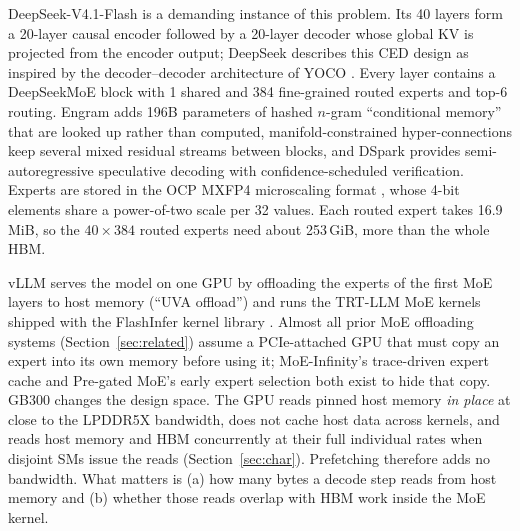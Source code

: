 \documentclass{article}
\newcommand{\secref}[1]{Section~\ref{#1}}
\begin{document}
DeepSeek-V4.1-Flash \citep{deepseekv41} is a demanding instance of this problem. Its 40 layers form a 20-layer causal
encoder followed by a 20-layer decoder whose global KV is projected from the encoder output; DeepSeek describes this
CED design as inspired by the decoder--decoder architecture of YOCO \citep{yoco}. Every layer contains a DeepSeekMoE
block \citep{deepseekmoe} with 1 shared and 384 fine-grained routed experts and top-6 routing. Engram \citep{engram}
adds 196B parameters of hashed $n$-gram ``conditional memory'' that are looked up rather than computed,
manifold-constrained hyper-connections \citep[mHC;][]{mhc} keep several mixed residual streams between blocks, and
DSpark \citep{dspark} provides semi-autoregressive speculative decoding with confidence-scheduled verification. Experts
are stored in the OCP MXFP4 microscaling format \citep{microscaling}, whose 4-bit elements share a power-of-two scale
per 32 values. Each routed expert takes 16.9\,MiB, so the $40 \times 384$ routed experts need about 253\,GiB, more than
the whole HBM.

vLLM \citep{vllm} serves the model on one GPU by offloading the experts of the first MoE layers to host memory (``UVA
offload'') and runs the TRT-LLM MoE kernels shipped with the FlashInfer kernel library \citep{flashinfer}. Almost all
prior MoE offloading systems (\secref{sec:related}) assume a PCIe-attached GPU that must copy an expert into its own
memory before using it; MoE-Infinity's trace-driven expert cache \citep{moeinfinity} and Pre-gated MoE's early expert
selection \citep{pregated} both exist to hide that copy. GB300 changes the design space. The GPU reads pinned host
memory \emph{in place} at close to the LPDDR5X bandwidth, does not cache host data across kernels, and reads host memory
and HBM concurrently at their full individual rates when disjoint SMs issue the reads (\secref{sec:char}). Prefetching
therefore adds no bandwidth. What matters is (a) how many bytes a decode step reads from host memory and (b) whether
those reads overlap with HBM work inside the MoE kernel.
\end{document}
